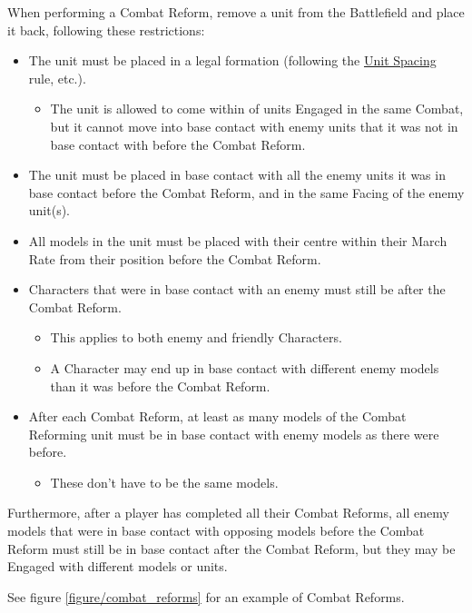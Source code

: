 When performing a Combat Reform, remove a unit from the Battlefield and place it back, following these restrictions:

\begin{itemize}
\item The unit must be placed in a legal formation (following the \hyperref[unit_spacing]{Unit Spacing} rule, etc.).
\begin{itemize}
\item The unit is allowed to come within  of units Engaged in the same Combat, but it cannot move into base contact with enemy units that it was not in base contact with before the Combat Reform.
\end{itemize}
\item The unit must be placed in base contact with all the enemy units it was in base contact before the Combat Reform, and in the same Facing of the enemy unit(s).
\item All models in the unit must be placed with their centre within their March Rate from their position before the Combat Reform.
\item Characters that were in base contact with an enemy must still be after the Combat Reform.
\begin{itemize}
\item This applies to both enemy and friendly Characters.
\item A Character may end up in base contact with different enemy models than it was before the Combat Reform.
\end{itemize}
\item After each Combat Reform, at least as many models of the Combat Reforming unit must be in base contact with enemy models as there were before.
\begin{itemize}
\item These don't have to be the same models.
\end{itemize}
\end{itemize}

Furthermore, after a player has completed all their Combat Reforms, all enemy models that were in base contact with opposing models before the Combat Reform must still be in base contact after the Combat Reform, but they may be Engaged with different models or units.

See figure \ref{figure/combat_reforms} for an example of Combat Reforms.

\newcommand{\figCombRefA}{a)}
\newcommand{\figCombRefB}{b)}
\newcommand{\figCombRefC}{c)}
\newcommand{\figCombRefCharOne}{{\fontsize{7}{8}\selectfont$C_{1}$}}
\newcommand{\figCombRefCharTwo}{{\fontsize{7}{8}\normalfontsize$C_{2}$}}

